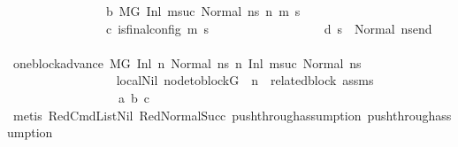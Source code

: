 \begin{isabellebody}
\ \ \ \ \ \ \ \ \ \ \ \ \ \ \ \ b{\isacharcolon}{\kern0pt}\ {\isachardoublequoteopen}M{\isacharcomma}{\kern0pt}{\isasymLambda}{\isacharcomma}{\kern0pt}{\isasymGamma}{\isacharcomma}{\kern0pt}{\isasymOmega}{\isacharcomma}{\kern0pt}G\ {\isasymturnstile}{\isacharparenleft}{\kern0pt}Inl\ msuc{}{\isacharcomma}{\kern0pt}\ Normal\ ns{}{\isacharparenright}{\kern0pt}\ {\isacharminus}{\kern0pt}n{\isasymrightarrow}{\isacharasterisk}{\kern0pt}\ {\isacharparenleft}{\kern0pt}m{\isacharprime}{\kern0pt}{\isacharcomma}{\kern0pt}\ s{\isacharprime}{\kern0pt}{\isacharparenright}{\kern0pt}{\isachardoublequoteclose}\ \isanewline
\ \ \ \ \ \ \ \ \ \ \ \ \ \ \ \ c{\isacharcolon}{\kern0pt}\ {\isachardoublequoteopen}is{\isacharunderscore}{\kern0pt}final{\isacharunderscore}{\kern0pt}config\ {\isacharparenleft}{\kern0pt}m{\isacharprime}{\kern0pt}{\isacharcomma}{\kern0pt}\ s{\isacharprime}{\kern0pt}{\isacharparenright}{\kern0pt}{\isachardoublequoteclose}\ \ \isanewline
\ \ \ \ \ \ \ \ \ \ \ \ \ \ \ \ d{\isacharcolon}{\kern0pt}\ {\isachardoublequoteopen}{\isacharparenleft}{\kern0pt}s{\isacharprime}{\kern0pt}\ {\isacharequal}{\kern0pt}\ Normal\ ns{\isacharunderscore}{\kern0pt}end{\isacharparenright}{\kern0pt}{\isachardoublequoteclose}\isanewline
\ \ \ \ \ \ \ \ \ \ \ \ \ \ \isamarkupfalse%
\ one{\isacharunderscore}{\kern0pt}block{\isacharunderscore}{\kern0pt}advance{\isacharcolon}{\kern0pt}\ {\isachardoublequoteopen}M{\isacharcomma}{\kern0pt}{\isasymLambda}{\isacharcomma}{\kern0pt}{\isasymGamma}{\isacharcomma}{\kern0pt}{\isasymOmega}{\isacharcomma}{\kern0pt}G\ {\isasymturnstile}{\isacharparenleft}{\kern0pt}Inl\ n{\isacharcomma}{\kern0pt}\ Normal\ ns{}{\isacharparenright}{\kern0pt}\ {\isacharminus}{\kern0pt}n{\isasymrightarrow}\ {\isacharparenleft}{\kern0pt}Inl\ msuc{}{\isacharcomma}{\kern0pt}\ Normal\ ns{}{\isacharparenright}{\kern0pt}{\isachardoublequoteclose}\ \isanewline
\ \ \ \ \ \ \ \ \ \ \ \ \ \ \ \ \isamarkupfalse%
\ local{\isachardot}{\kern0pt}Nil\ {\isacartoucheopen}node{\isacharunderscore}{\kern0pt}to{\isacharunderscore}{\kern0pt}block{\isacharparenleft}{\kern0pt}G{\isacharparenright}{\kern0pt}\ {\isacharbang}{\kern0pt}\ n\ {\isacharequal}{\kern0pt}\ related{\isacharunderscore}{\kern0pt}block{\isacartoucheclose}\ assms{\isacharparenleft}{\kern0pt}{}{\isacharparenright}{\kern0pt}\ \isanewline
\ \ \ \ \ \ \ \ \ \ \ \ \ \ \ \ \ \ a\ b\ c\isanewline
\ \ \ \ \ \ \ \ \ \ \ \ \ \ \ \ \isamarkupfalse%
\ {\isacharparenleft}{\kern0pt}metis\ RedCmdListNil\ RedNormalSucc\ push{\isacharunderscore}{\kern0pt}through{\isacharunderscore}{\kern0pt}assumption{}\ push{\isacharunderscore}{\kern0pt}through{\isacharunderscore}{\kern0pt}assumption{}{\isacharparenright}{\kern0pt}\ \ \isanewline

\end{isabellebody}

